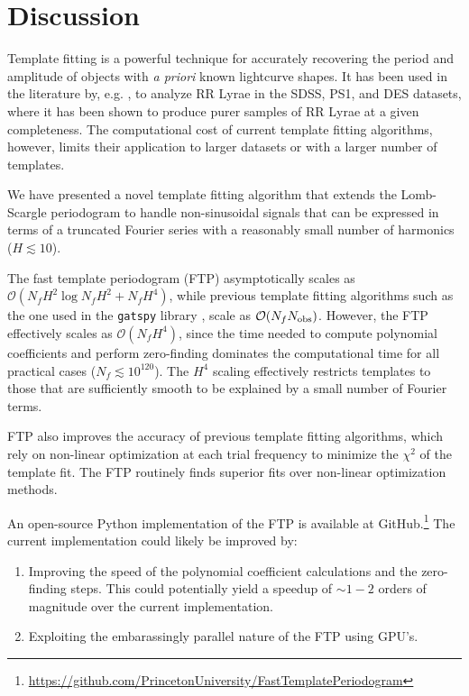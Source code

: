 \documentclass[apj]{emulateapj}
\newcommand{\bigO}{\mathcal{O}}
\begin{document}
\section{Discussion}\label{sec:discussion}

Template fitting is a powerful technique for accurately recovering
the period and amplitude of objects with \emph{a priori} known
lightcurve shapes. It has been used in the literature by, e.g.
\cite{Stringer_et_al_2019,Sesar_etal_2016, Sesar_etal_2010}, to analyze RR Lyrae in the
SDSS, PS1, and DES datasets, where it has been shown to produce purer
samples of RR Lyrae at a given completeness. The computational
cost of current template fitting algorithms, however, limits their
application to larger datasets or with a larger number of templates.

We have presented a novel template fitting algorithm that extends
the Lomb-Scargle periodogram \citep{Lomb_1976,Scargle_1982,Barning_1963,Vanicek_1971}
to handle non-sinusoidal signals that can be expressed in terms of
a truncated Fourier series with a reasonably small number of harmonics
($H\lesssim 10$).

The fast template periodogram (FTP) asymptotically scales as
$\bigO(N_fH^2\log N_fH^2 + N_fH^4)$, while previous template fitting algorithms
such as the one used in the \texttt{gatspy} library \citep{gatspy},
scale as $\bigO(N_fN_{\rm obs})$. However, the FTP effectively
scales as $\bigO(N_fH^4)$, since the time needed to compute polynomial
coefficients and perform zero-finding dominates the computational time
for all practical cases ($N_f \lesssim 10^{120}$).
The $H^4$ scaling effectively restricts templates to those that are
sufficiently smooth to be explained by a small number of Fourier terms.

FTP also improves the accuracy of previous template fitting algorithms,
which rely on non-linear optimization at each trial frequency to minimize
the $\chi^2$ of the template fit. The FTP routinely finds superior fits over
non-linear optimization methods.

An open-source Python implementation of the FTP is available at
GitHub.\footnote{\url{https://github.com/PrincetonUniversity/FastTemplatePeriodogram}}
The current implementation could likely be improved by:

\begin{enumerate}
    \item Improving the speed of the polynomial
          coefficient calculations and the zero-finding steps. This could potentially yield
          a speedup of $\sim1-2$ orders of magnitude over the current implementation.
    \item Exploiting the embarassingly parallel nature of the FTP using GPU's.
\end{enumerate}
\end{document}
